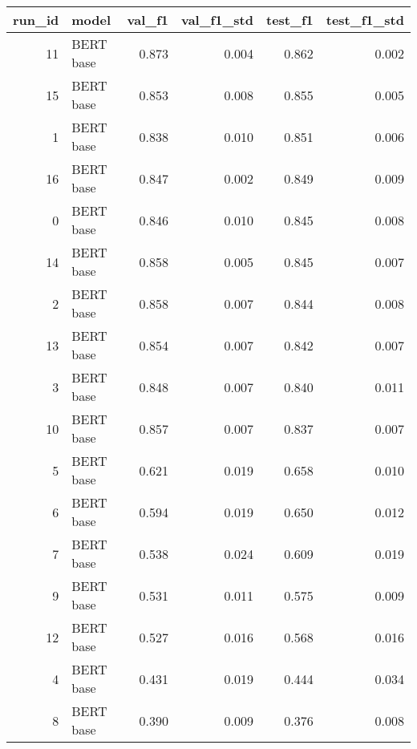 \begin{tabular}{rlrrrr}
\toprule
 run\_id &     model &  val\_f1 &  val\_f1\_std &  test\_f1 &  test\_f1\_std \\
\midrule
     11 & BERT base &   0.873 &       0.004 &    0.862 &        0.002 \\
     15 & BERT base &   0.853 &       0.008 &    0.855 &        0.005 \\
      1 & BERT base &   0.838 &       0.010 &    0.851 &        0.006 \\
     16 & BERT base &   0.847 &       0.002 &    0.849 &        0.009 \\
      0 & BERT base &   0.846 &       0.010 &    0.845 &        0.008 \\
     14 & BERT base &   0.858 &       0.005 &    0.845 &        0.007 \\
      2 & BERT base &   0.858 &       0.007 &    0.844 &        0.008 \\
     13 & BERT base &   0.854 &       0.007 &    0.842 &        0.007 \\
      3 & BERT base &   0.848 &       0.007 &    0.840 &        0.011 \\
     10 & BERT base &   0.857 &       0.007 &    0.837 &        0.007 \\
      5 & BERT base &   0.621 &       0.019 &    0.658 &        0.010 \\
      6 & BERT base &   0.594 &       0.019 &    0.650 &        0.012 \\
      7 & BERT base &   0.538 &       0.024 &    0.609 &        0.019 \\
      9 & BERT base &   0.531 &       0.011 &    0.575 &        0.009 \\
     12 & BERT base &   0.527 &       0.016 &    0.568 &        0.016 \\
      4 & BERT base &   0.431 &       0.019 &    0.444 &        0.034 \\
      8 & BERT base &   0.390 &       0.009 &    0.376 &        0.008 \\
\bottomrule
\end{tabular}
